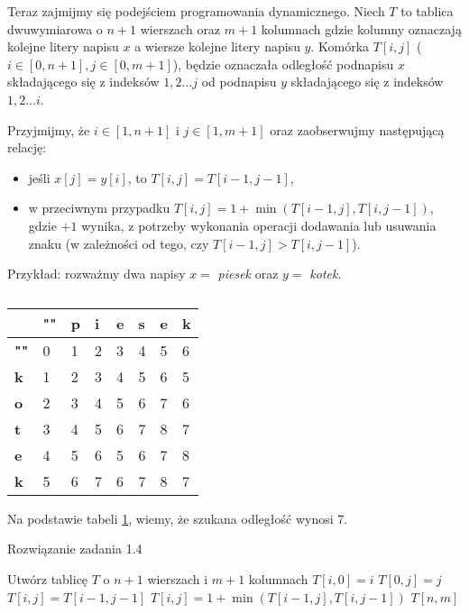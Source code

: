 Teraz zajmijmy się podejściem programowania dynamicznego.
Niech $T$ to tablica dwuwymiarowa o
$n + 1$ wierszach oraz $m + 1$ kolumnach
gdzie kolumny oznaczają kolejne litery napisu $x$ a
wiersze kolejne litery napisu $y$. Komórka
$T[i, j]$ ($i \in [0, n+1], j \in [0, m+1]$), będzie 
oznaczała odległość 
podnapisu $x$ składającego się z indeksów $1,2 \ldots j$ od 
podnapisu $y$ składającego się z indeksów $1,2 \ldots i$.

Przyjmijmy, że $i \in [1, n+1]$ i $ j \in [1, m+1]$ oraz 
zaobserwujmy następującą relację: 
\begin{itemize}
	\item jeśli $x[j]=y[i]$, to $T[i, j] = T[i - 1, j - 1]$,
	\item w przeciwnym przypadku $T[i, j] = 1 + \min(T[i - 1, j], T[i, j - 1])$, gdzie
	$+1$ wynika, z potrzeby wykonania operacji dodawania lub usuwania znaku
	(w zależności od tego, czy $T[i - 1, j] > T[i, j - 1]$).
\end{itemize}

Przykład: rozważmy dwa napisy $x =$ \textit{piesek} oraz $y =$ \textit{kotek}.

\begin{table}[H]
	\center
	\begin{tabular}{|l|lllllll|}
		\hline \diagbox{$y$}{$x$}
		& \multicolumn{1}{l|}{\textbf{""}} & \multicolumn{1}{l|}{\textbf{p}} & \multicolumn{1}{l|}{\textbf{i}} & \multicolumn{1}{l|}{\textbf{e}} & \multicolumn{1}{l|}{\textbf{s}} & \multicolumn{1}{l|}{\textbf{e}} & \multicolumn{1}{l|}{\textbf{k}} \\ \hline
		\textbf{""} & 0 & 1 & 2 & 3 & 4 & 5 & 6 \\ \cline{1-1}
		\textbf{k}  & 1 & 2 & 3 & 4 & 5 & 6 & 5 \\ \cline{1-1}
		\textbf{o}  & 2 & 3 & 4 & 5 & 6 & 7 & 6 \\ \cline{1-1}
		\textbf{t}  & 3 & 4 & 5 & 6 & 7 & 8 & 7 \\ \cline{1-1}
		\textbf{e}  & 4 & 5 & 6 & 5 & 6 & 7 & 8 \\ \cline{1-1}
		\textbf{k}  & 5 & 6 & 7 & 6 & 7 & 8 & 7 \\ \cline{1-1}
		\hline
	\end{tabular}
	\caption{}
	\label{tab_zad14}
\end{table}

Na podstawie tabeli \ref{tab_zad14}, wiemy, że szukana odległość wynosi 7.

\begin{algorithm}[H]
	\caption{Rozwiązanie zadania 1.4}
	\begin{algorithmic}[1]
		\State Utwórz tablicę $T$ o $n + 1$ wierszach i $m + 1$ kolumnach
		\State $T[i, 0] = i$
		\EndFor		
		\State $T[0, j] = j$
		\EndFor
		\State $T[i, j] = T[i - 1, j - 1]$
		\Else
		\State $T[i, j] = 1 + \min(T[i - 1, j], T[i, j - 1])$
		\EndIf
		\EndFor
		\EndFor
		\State \Return $T[n, m]$
		\EndProcedure 
	\end{algorithmic}
	\label{Zadanie14}
\end{algorithm}

